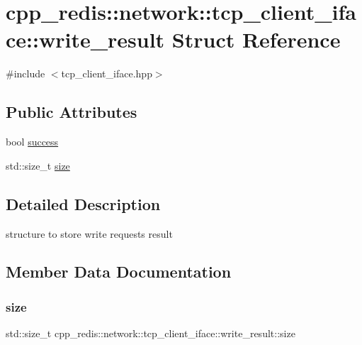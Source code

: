 \hypertarget{structcpp__redis_1_1network_1_1tcp__client__iface_1_1write__result}{}\section{cpp\+\_\+redis\+:\+:network\+:\+:tcp\+\_\+client\+\_\+iface\+:\+:write\+\_\+result Struct Reference}
\label{structcpp__redis_1_1network_1_1tcp__client__iface_1_1write__result}


{\ttfamily \#include $<$tcp\+\_\+client\+\_\+iface.\+hpp$>$}

\subsection*{Public Attributes}
\begin{DoxyCompactItemize}
\item 
bool \hyperlink{structcpp__redis_1_1network_1_1tcp__client__iface_1_1write__result_a677696941c9a7164bc0b93b5d8380d1a}{success}
\item 
std\+::size\+\_\+t \hyperlink{structcpp__redis_1_1network_1_1tcp__client__iface_1_1write__result_a580f3dbe5ea3f6f4b6b4ca0bfad2c06c}{size}
\end{DoxyCompactItemize}


\subsection{Detailed Description}
structure to store write requests result 

\subsection{Member Data Documentation}
\mbox{\label{structcpp__redis_1_1network_1_1tcp__client__iface_1_1write__result_a580f3dbe5ea3f6f4b6b4ca0bfad2c06c}} 
\subsubsection{\texorpdfstring{size}{size}}
{\footnotesize\ttfamily std\+::size\+\_\+t cpp\+\_\+redis\+::network\+::tcp\+\_\+client\+\_\+iface\+::write\+\_\+result\+::size}

